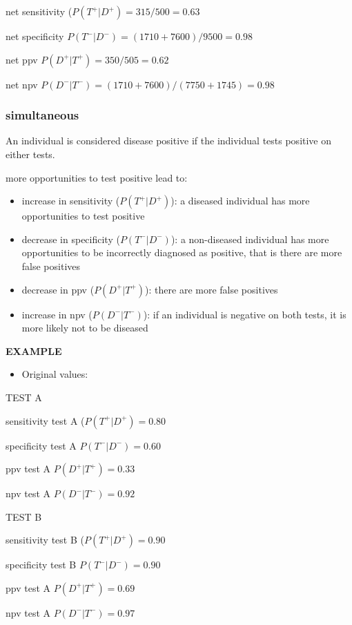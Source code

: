 \documentclass[
]{article}
\providecommand{\tightlist}{%
  \setlength{\itemsep}{0pt}\setlength{\parskip}{0pt}}
\begin{document}
net sensitivity (\(P(T^+|D^+)= 315/500= 0.63\)

net specificity \(P(T^-|D^-) = (1710+7600)/9500= 0.98\)

net ppv \(P(D^+|T^+)= 350/505= 0.62\)

net npv \(P(D^-|T^-)= (1710+7600)/ (7750+1745) = 0.98\)

\hypertarget{simultaneous}{%
\subsubsection{simultaneous}\label{simultaneous}}

An individual is considered disease positive if the individual tests
positive on either tests.

more opportunities to test positive lead to:

\begin{itemize}
\item
  increase in sensitivity (\(P(T^+|D^+)\)): a diseased individual has
  more opportunities to test positive
\item
  decrease in specificity (\(P(T^-|D^-)\)): a non-diseased individual
  has more opportunities to be incorrectly diagnosed as positive, that
  is there are more false positives
\item
  decrease in ppv (\(P(D^+|T^+)\)): there are more false positives
\item
  increase in npv (\(P(D^-|T^-)\)): if an individual is negative on both
  tests, it is more likely not to be diseased
\end{itemize}

\textbf{EXAMPLE}

\begin{itemize}
\tightlist
\item
  Original values:
\end{itemize}

TEST A

sensitivity test A (\(P(T^+|D^+)= 0.80\)

specificity test A \(P(T^-|D^-) = 0.60\)

ppv test A \(P(D^+|T^+)= 0.33\)

npv test A \(P(D^-|T^-) = 0.92\)

TEST B

sensitivity test B (\(P(T^+|D^+)= 0.90\)

specificity test B \(P(T^-|D^-) = 0.90\)

ppv test A \(P(D^+|T^+)= 0.69\)

npv test A \(P(D^-|T^-) = 0.97\)
\end{document}
